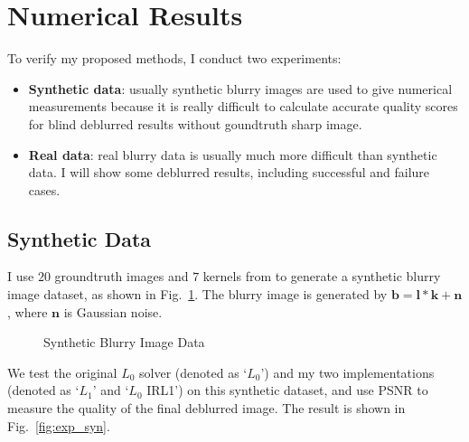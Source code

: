 \documentclass[journal, onecolumn, 10pt]{IEEEtran}
\begin{document}
\section{Numerical Results}
\label{sec:exp}
To verify my proposed methods, I conduct two experiments:
\begin{itemize}
\item \textbf{Synthetic data}: usually synthetic blurry images are used to give numerical measurements because it is really difficult to calculate accurate quality scores for blind deblurred results without goundtruth sharp image. 
\item \textbf{Real data}: real blurry data is usually much more difficult than synthetic data. I will show some deblurred results, including successful and failure cases.
\end{itemize} 
 
\subsection{Synthetic Data}
\label{sec:exp_syn}
I use $20$ groundtruth images and $7$ kernels from \cite{lai2016comparative}\cite{levin2009understanding} to generate a synthetic blurry image dataset, as shown in Fig.~\ref{fig:synthetic_blur_data}. The blurry image is generated by $\mathbf{b} = \mathbf{l} * \mathbf{k} + \mathbf{n}$, where $\mathbf{n}$ is Gaussian noise.

\begin{figure}[h!]
\centering
{}
\hspace{\fill}
\hspace{\fill}
\caption{Synthetic Blurry Image Data}
\label{fig:synthetic_blur_data}
\end{figure}

We test the original $L_0$ solver \cite{xu2013unnatural} (denoted as `$L_0$') and my two implementations (denoted as `$L_1$' and `$L_0$ IRL1') on this synthetic dataset, and use PSNR to measure the quality of the final deblurred image. The result is shown in Fig.~\ref{fig:exp_syn}.
\end{document}
